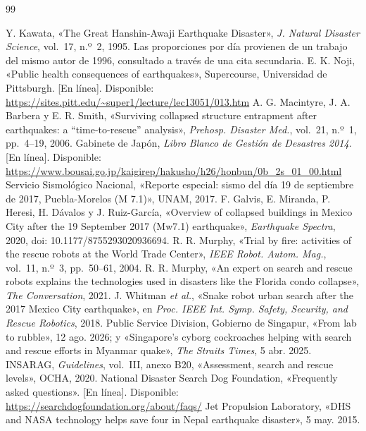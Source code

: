 \renewcommand{\refname}{Referencias}
{\footnotesize
\begin{thebibliography}{99}
\setlength{\itemsep}{1pt}

 Y. Kawata, «The Great Hanshin-Awaji Earthquake Disaster», \textit{J. Natural Disaster Science}, vol.~17, n.º~2, 1995. Las proporciones por día provienen de un trabajo del mismo autor de 1996, consultado a través de una cita secundaria.
 E. K. Noji, «Public health consequences of earthquakes», Supercourse, Universidad de Pittsburgh. [En línea]. Disponible: \url{https://sites.pitt.edu/~super1/lecture/lec13051/013.htm}
 A. G. Macintyre, J. A. Barbera y E. R. Smith, «Surviving collapsed structure entrapment after earthquakes: a ``time-to-rescue'' analysis», \textit{Prehosp. Disaster Med.}, vol.~21, n.º~1, pp.~4--19, 2006.
 Gabinete de Japón, \textit{Libro Blanco de Gestión de Desastres 2014}. [En línea]. Disponible: \url{https://www.bousai.go.jp/kaigirep/hakusho/h26/honbun/0b_2s_01_00.html}
 Servicio Sismológico Nacional, «Reporte especial: sismo del día 19 de septiembre de 2017, Puebla-Morelos (M 7.1)», UNAM, 2017.
 F. Galvis, E. Miranda, P. Heresi, H. Dávalos y J. Ruiz-García, «Overview of collapsed buildings in Mexico City after the 19 September 2017 (Mw7.1) earthquake», \textit{Earthquake Spectra}, 2020, doi: 10.1177/8755293020936694.
 R. R. Murphy, «Trial by fire: activities of the rescue robots at the World Trade Center», \textit{IEEE Robot. Autom. Mag.}, vol.~11, n.º~3, pp.~50--61, 2004.
 R. R. Murphy, «An expert on search and rescue robots explains the technologies used in disasters like the Florida condo collapse», \textit{The Conversation}, 2021.
 J. Whitman \textit{et al.}, «Snake robot urban search after the 2017 Mexico City earthquake», en \textit{Proc. IEEE Int. Symp. Safety, Security, and Rescue Robotics}, 2018.
 Public Service Division, Gobierno de Singapur, «From lab to rubble», 12 ago. 2026; y «Singapore's cyborg cockroaches helping with search and rescue efforts in Myanmar quake», \textit{The Straits Times}, 5 abr. 2025.
 INSARAG, \textit{Guidelines}, vol.~III, anexo B20, «Assessment, search and rescue levels», OCHA, 2020.
 National Disaster Search Dog Foundation, «Frequently asked questions». [En línea]. Disponible: \url{https://searchdogfoundation.org/about/faqs/}
 Jet Propulsion Laboratory, «DHS and NASA technology helps save four in Nepal earthquake disaster», 5 may. 2015.

\end{thebibliography}}
